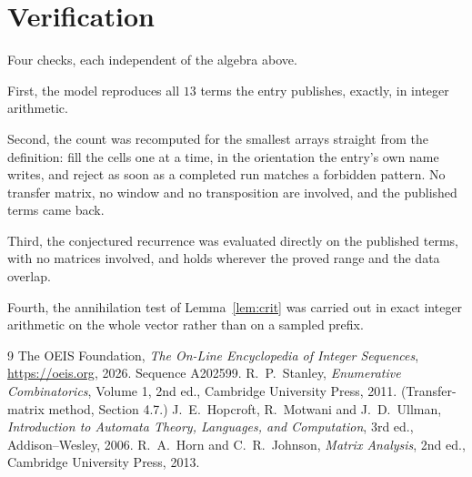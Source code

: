 \documentclass[11pt,a4paper]{article}
\theoremstyle{plain}
\theoremstyle{definition}
\begin{document}
\section{Verification}

Four checks, each independent of the algebra above.

First, the model reproduces all $13$ terms the entry publishes, exactly, in integer
arithmetic.

Second, the count was recomputed for the smallest arrays straight from the definition: fill the
cells one at a time, in the orientation the entry's own name writes, and reject as soon as a
completed run matches a forbidden pattern. No transfer matrix, no window and no transposition
are involved, and the published terms came back.

Third, the conjectured recurrence was evaluated directly on the published terms, with no
matrices involved, and holds wherever the proved range and the data overlap.

Fourth, the annihilation test of Lemma~\ref{lem:crit} was carried out in exact integer
arithmetic on the whole vector rather than on a sampled prefix.

\begin{thebibliography}{9}
 The OEIS Foundation, \emph{The On-Line Encyclopedia of Integer
Sequences}, \url{https://oeis.org}, 2026. Sequence A202599.
 R.~P.~Stanley, \emph{Enumerative Combinatorics}, Volume 1, 2nd ed.,
Cambridge University Press, 2011. (Transfer-matrix method, Section 4.7.)
 J.~E.~Hopcroft, R.~Motwani and J.~D.~Ullman, \emph{Introduction to Automata
Theory, Languages, and Computation}, 3rd ed., Addison--Wesley, 2006.
 R.~A.~Horn and C.~R.~Johnson, \emph{Matrix Analysis}, 2nd ed., Cambridge
University Press, 2013.
\end{thebibliography}
\end{document}
